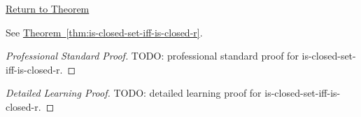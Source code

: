 \newpage
{}
\label{prf:is-closed-set-iff-is-closed-r}

\begin{remark*}[Return]
\hyperref[thm:is-closed-set-iff-is-closed-r]{Return to Theorem}
\end{remark*}

\begin{theorem*}
See \hyperref[thm:is-closed-set-iff-is-closed-r]{Theorem~\ref*{thm:is-closed-set-iff-is-closed-r}}.
\end{theorem*}

\begin{proof}[Professional Standard Proof]
\LRAProofBodyStart
TODO: professional standard proof for is-closed-set-iff-is-closed-r.
\end{proof}

\begin{proof}[Detailed Learning Proof]
\LRAProofBodyStart
TODO: detailed learning proof for is-closed-set-iff-is-closed-r.
\end{proof}

\begin{remark*}
\end{remark*}

\begin{dependencies}
\NoLocalDependencies
\end{dependencies}

\clearpage
